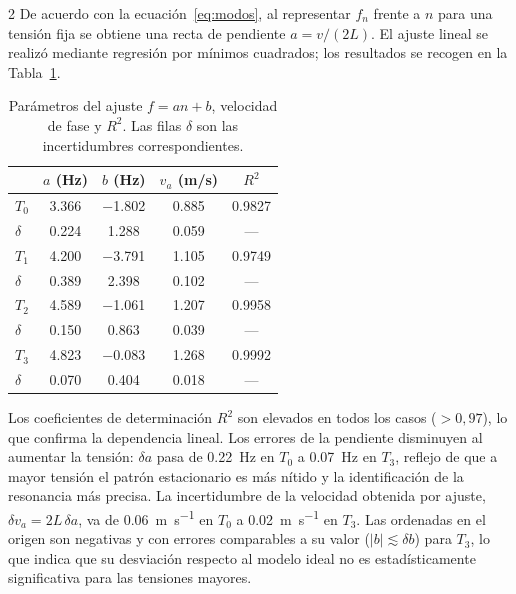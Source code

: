 \documentclass[12pt,a4paper]{article}
\begin{document}
\begin{multicols}{2}
De acuerdo con la ecuación~\eqref{eq:modos}, al representar $f_n$ frente a $n$ para una tensión fija se obtiene una recta de pendiente $a = v/(2L)$. El ajuste lineal se realizó mediante regresión por mínimos cuadrados; los resultados se recogen en la Tabla~\ref{tab:ajustes}.

\begin{table}[H]
  \centering
  \caption{Parámetros del ajuste $f = an + b$, velocidad de fase y $R^2$. Las filas $\delta$ son las incertidumbres correspondientes.}
  \label{tab:ajustes}
  \small
  \setlength{\tabcolsep}{3pt}
  \begin{tabular}{lcccc}
    \toprule
    & $a$ (Hz) & $b$ (Hz) & $v_a$ (m/s) & $R^2$ \\
    \midrule
    $T_0$     & \num{3.366} & \num{-1.802} & \num{0.885} & \num{0.9827} \\
    $\delta$  & \num{0.224} & \num{1.288}  & \num{0.059} & ---          \\[2pt]
    $T_1$     & \num{4.200} & \num{-3.791} & \num{1.105} & \num{0.9749} \\
    $\delta$  & \num{0.389} & \num{2.398}  & \num{0.102} & ---          \\[2pt]
    $T_2$     & \num{4.589} & \num{-1.061} & \num{1.207} & \num{0.9958} \\
    $\delta$  & \num{0.150} & \num{0.863}  & \num{0.039} & ---          \\[2pt]
    $T_3$     & \num{4.823} & \num{-0.083} & \num{1.268} & \num{0.9992} \\
    $\delta$  & \num{0.070} & \num{0.404}  & \num{0.018} & ---          \\
    \bottomrule
  \end{tabular}
\end{table}

Los coeficientes de determinación $R^2$ son elevados en todos los casos ($>0{,}97$), lo que confirma la dependencia lineal. Los errores de la pendiente disminuyen al aumentar la tensión: $\delta a$ pasa de \SI{0.22}{\hertz} en $T_0$ a \SI{0.07}{\hertz} en $T_3$, reflejo de que a mayor tensión el patrón estacionario es más nítido y la identificación de la resonancia más precisa. La incertidumbre de la velocidad obtenida por ajuste, $\delta v_a = 2L\,\delta a$, va de \SI{0.06}{\metre\per\second} en $T_0$ a \SI{0.02}{\metre\per\second} en $T_3$. Las ordenadas en el origen son negativas y con errores comparables a su valor ($|b| \lesssim \delta b$) para $T_3$, lo que indica que su desviación respecto al modelo ideal no es estadísticamente significativa para las tensiones mayores.


\end{multicols}
\end{document}
